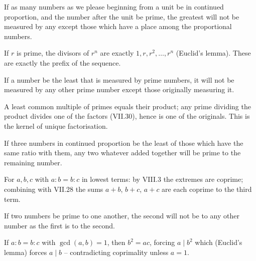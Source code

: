 \begin{claim}
\label{prop:IX.13}
If as many numbers as we please beginning from a unit be in continued
proportion, and the number after the unit be prime, the greatest will
not be measured by any except those which have a place among the
proportional numbers.
\end{claim}
\begin{evidence}[Proof of IX.13]
\label{ev:IX.13}
If $r$ is prime, the divisors of $r^n$ are exactly $1, r, r^2, \dots,
r^n$ (Euclid's lemma).  These are exactly the prefix of the sequence.
\end{evidence}

\begin{claim}
\label{prop:IX.14}
If a number be the least that is measured by prime numbers, it will
not be measured by any other prime number except those originally
measuring it.
\end{claim}
\begin{evidence}[Proof of IX.14]
\label{ev:IX.14}
A least common multiple of primes equals their product; any prime
dividing the product divides one of the factors (VII.30), hence is
one of the originals.  This is the kernel of unique factorisation.
\end{evidence}

\begin{claim}
\label{prop:IX.15}
If three numbers in continued proportion be the least of those which
have the same ratio with them, any two whatever added together will
be prime to the remaining number.
\end{claim}
\begin{evidence}[Proof of IX.15]
\label{ev:IX.15}
For $a, b, c$ with $a : b = b : c$ in lowest terms: by VIII.3 the
extremes are coprime; combining with VII.28 the sums $a+b$, $b+c$,
$a+c$ are each coprime to the third term.
\end{evidence}

\begin{claim}
\label{prop:IX.16}
If two numbers be prime to one another, the second will not be to
any other number as the first is to the second.
\end{claim}
\begin{evidence}[Proof of IX.16]
\label{ev:IX.16}
If $a : b = b : c$ with $\gcd(a, b) = 1$, then $b^2 = ac$, forcing
$a \mid b^2$ which (Euclid's lemma) forces $a \mid b$ -- contradicting
coprimality unless $a = 1$.
\end{evidence}

